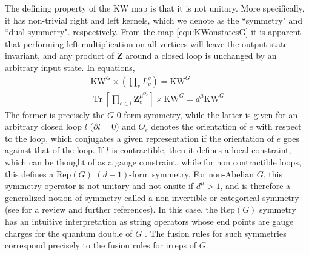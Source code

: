 \documentclass[nofootinbib,prx,twocolumn,showpacs,superscriptaddress,notitlepage,amsmath,amssymb]{revtex4-2}
\theoremstyle{definition}
\def\KW{\text{KW}}
\def\Rep{\text{Rep}}
\def\bs#1{\boldsymbol{#1}}
\DeclareMathOperator{\Tr}{Tr}
\begin{document}
The defining property of the KW map is that it is not unitary. More specifically, it has non-trivial right and left kernels, which we denote as the ``symmetry" and ``dual symmetry". respectively. From the map \eqref{equ:KWonstatesG} it is apparent that performing left multiplication on all vertices will leave the output state invariant, and any product of $\bs Z$ around a closed loop is unchanged by an arbitrary input state. In equations,
\begin{align}
    \KW^G \times \left(\prod_v L^g_v\right)  = \KW^G\label{eq:G0form}\\
   \Tr \left[\prod_{e \in l}  \bs  Z^{\mu^{O_e}}_e\right] \times \KW^G = d^\mu\KW^G 
    \label{eq:repGd-1form}
\end{align}
The former is precisely  the $G$ 0-form symmetry, while the latter is given for an arbitrary closed loop $l$ ($\partial l=0$) and $O_e$ denotes the orientation of $e$ with respect to the loop, which conjugates a given representation if the orientation of $e$ goes against that of the loop. If $l$ is contractible, then it defines a local constraint, which can be thought of as a gauge constraint, while for non contractible loops, this defines a $\Rep(G)$ $(d-1)$-form symmetry. For non-Abelian $G$, this symmetry operator is not unitary and not onsite if $d^\mu > 1$, and is therefore a generalized notion of symmetry called a non-invertible or categorical symmetry (see \cite{Mcgreevy22,Cordova22Snowmass} for a review and further references). In this case, the $\Rep(G)$ symmetry has an intuitive interpretation as string operators whose end points are gauge charges for the quantum double of $G$ \cite{Bultinck17}. The fusion rules for such symmetries correspond precisely to the fusion rules for irreps of $G$.
\end{document}
